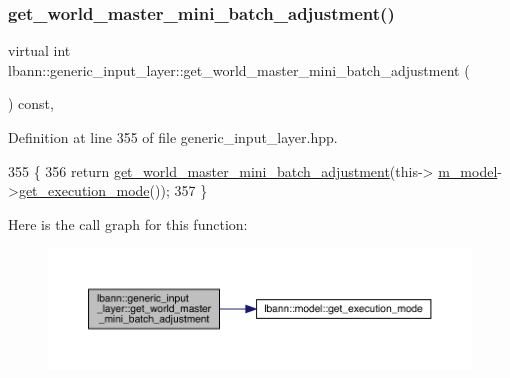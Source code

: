 \subsubsection{\texorpdfstring{get\+\_\+world\+\_\+master\+\_\+mini\+\_\+batch\+\_\+adjustment()}{get\_world\_master\_mini\_batch\_adjustment()}\hspace{0.1cm}{\footnotesize\ttfamily [2/2]}}
{\footnotesize\ttfamily virtual int lbann\+::generic\+\_\+input\+\_\+layer\+::get\+\_\+world\+\_\+master\+\_\+mini\+\_\+batch\+\_\+adjustment (\begin{DoxyParamCaption}{ }\end{DoxyParamCaption}) const\hspace{0.3cm}{\ttfamily [inline]}, {\ttfamily [virtual]}}



Definition at line 355 of file generic\+\_\+input\+\_\+layer.\+hpp.


\begin{DoxyCode}
355                                                              \{
356     \textcolor{keywordflow}{return} \hyperlink{classlbann_1_1generic__input__layer_a111abcde5f53746dfd6c5fe18187ee57}{get\_world\_master\_mini\_batch\_adjustment}(this->
      \hyperlink{classlbann_1_1Layer_a3d9315e99574166f2f33e37b572021d2}{m\_model}->\hyperlink{classlbann_1_1model_addb40597cf29aa6d31b6a7d09ef48608}{get\_execution\_mode}());
357   \}
\end{DoxyCode}
Here is the call graph for this function\+:\nopagebreak
\begin{figure}[H]
\begin{center}
\leavevmode
\includegraphics[width=350pt]{classlbann_1_1generic__input__layer_a111abcde5f53746dfd6c5fe18187ee57_cgraph}
\end{center}
\end{figure}
\mbox{\label{classlbann_1_1generic__input__layer_ab4fa07865c28a35d39ff736075085aba}} 
